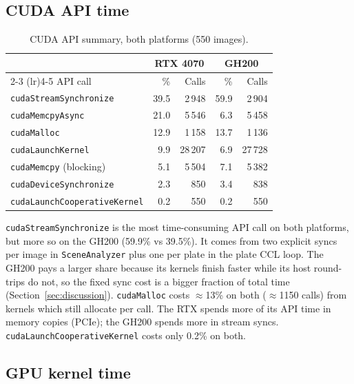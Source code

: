 \subsection{CUDA API time}

\begin{table}[H]
\centering
\small
\begin{tabular}{lrrrr}
\toprule
 & \multicolumn{2}{c}{\textbf{RTX 4070}} & \multicolumn{2}{c}{\textbf{GH200}} \\
\cmidrule(lr){2-3} \cmidrule(lr){4-5}
API call & \% & Calls & \% & Calls \\
\midrule
\texttt{cudaStreamSynchronize}       & 39.5 & 2\,948  & 59.9 & 2\,904 \\
\texttt{cudaMemcpyAsync}             & 21.0 & 5\,546  &  6.3 & 5\,458 \\
\texttt{cudaMalloc}                  & 12.9 & 1\,158  & 13.7 & 1\,136 \\
\texttt{cudaLaunchKernel}            &  9.9 & 28\,207 &  6.9 & 27\,728 \\
\texttt{cudaMemcpy} (blocking)       &  5.1 & 5\,504  &  7.1 & 5\,382 \\
\texttt{cudaDeviceSynchronize}       &  2.3 &    850  &  3.4 &    838 \\
\texttt{cudaLaunchCooperativeKernel} &  0.2 &    550  &  0.2 &    550 \\
\bottomrule
\end{tabular}
\normalsize
\caption{CUDA API summary, both platforms (550 images).}
\label{tab:api_sum}
\end{table}

\texttt{cudaStreamSynchronize} is the most time-consuming API call on both platforms, but more so on the GH200 (59.9\% vs 39.5\%).
It comes from two explicit syncs per image in \texttt{SceneAnalyzer} plus one per plate in the plate CCL loop.
The GH200 pays a larger share because its kernels finish faster while its host round-trips do not, so the fixed sync cost is a bigger fraction of total time (Section~\ref{sec:discussion}).
\texttt{cudaMalloc} costs $\approx$13\% on both ($\approx$1150 calls) from kernels which still allocate per call.
The RTX spends more of its API time in memory copies (PCIe); the GH200 spends more in stream syncs.
\texttt{cudaLaunchCooperativeKernel} costs only 0.2\% on both.

\subsection{GPU kernel time}

